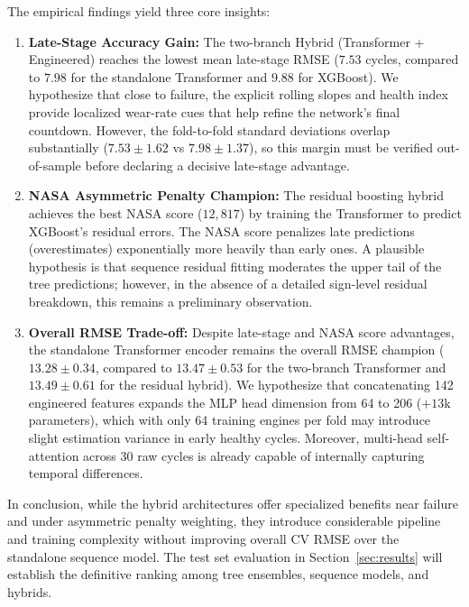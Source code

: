 The empirical findings yield three core insights:

\begin{enumerate}
\item \textbf{Late-Stage Accuracy Gain:} The two-branch Hybrid (Transformer + Engineered)
reaches the lowest mean late-stage RMSE ($7.53$ cycles, compared to $7.98$ for the
standalone Transformer and $9.88$ for XGBoost). We hypothesize that close to failure,
the explicit rolling slopes and health index provide localized wear-rate cues that help
refine the network's final countdown. However, the fold-to-fold standard deviations
overlap substantially ($7.53 \pm 1.62$ vs $7.98 \pm 1.37$), so this margin must be
verified out-of-sample before declaring a decisive late-stage advantage.

\item \textbf{NASA Asymmetric Penalty Champion:} The residual boosting hybrid achieves
the best NASA score ($12,817$) by training the Transformer to predict XGBoost's
residual errors. The NASA score penalizes late predictions (overestimates) exponentially
more heavily than early ones. A plausible hypothesis is that sequence residual fitting
moderates the upper tail of the tree predictions; however, in the absence of a detailed
sign-level residual breakdown, this remains a preliminary observation.

\item \textbf{Overall RMSE Trade-off:} Despite late-stage and NASA score advantages, the
standalone Transformer encoder remains the overall RMSE champion ($13.28 \pm 0.34$,
compared to $13.47 \pm 0.53$ for the two-branch Transformer and $13.49 \pm 0.61$ for the
residual hybrid). We hypothesize that concatenating 142 engineered features expands the
MLP head dimension from 64 to 206 ($+13\text{k}$ parameters), which with only 64
training engines per fold may introduce slight estimation variance in early healthy
cycles. Moreover, multi-head self-attention across 30 raw cycles is already capable of
internally capturing temporal differences.
\end{enumerate}

In conclusion, while the hybrid architectures offer specialized benefits near failure
and under asymmetric penalty weighting, they introduce considerable pipeline and
training complexity without improving overall CV RMSE over the standalone sequence
model. The test set evaluation in Section~\ref{sec:results} will establish the definitive
ranking among tree ensembles, sequence models, and hybrids.
